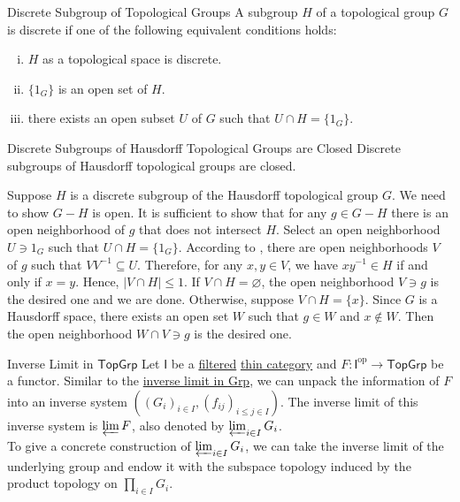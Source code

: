 \documentclass{report}
\begin{document}
\begin{definition}{Discrete Subgroup of Topological Groups}{}
	A subgroup $H$ of a topological group $G$ is {discrete} if one of the following equivalent conditions holds:
	\begin{enumerate}[(i)]
		\item $H$ as a topological space is discrete.
		\item $\{1_G\}$ is an open set of $H$.
		\item there exists an open subset $U$ of $G$ such that $U\cap H=\{1_G\}$.
	\end{enumerate}

\end{definition}

\begin{proposition}{Discrete Subgroups of Hausdorff Topological Groups are Closed}{}
	Discrete subgroups of Hausdorff topological groups are closed.
\end{proposition}
\begin{prf}
	Suppose $H$ is a discrete subgroup of the Hausdorff topological group $G$. We need to show $G-H$ is open. It is sufficient to show that for any $g \in G-H$ there is an open neighborhood of $g$ that does not intersect $H$. Select an open neighborhood $U \ni 1_G$ such that $U \cap H=\{1_G\}$. According to , there are open neighborhoods $V$ of $g$ such that $VV^{-1}\subseteq U$. Therefore, for any $x, y \in V$, we have $x y^{-1} \in H$ if and only if $x=y$. Hence, $|V \cap H| \leq 1$. If $V \cap H=\varnothing$, the open neighborhood $V\ni g$ is the desired one and we are done. Otherwise, suppose $V \cap H=\{x\}$. Since $G$ is a Hausdorff space, there exists an open set $W$ such that $g \in W$ and $x \notin W$. Then the open neighborhood $W \cap V \ni g$ is the desired one.
\end{prf}


\begin{definition}{Inverse Limit in $\mathsf{TopGrp}$}{}
	Let $\mathsf{I}$ be a \hyperref[th:filtered_category]{filtered} \hyperref[th:thin_category]{thin category} and $F:\mathsf{I}^{\mathrm{op}}\to \mathsf{TopGrp}$ be a functor. Similar to the \hyperref[th:inverse_limit_of_groups]{inverse limit in \textsf{Grp}}, we can unpack the information of $F$ into an inverse system $\left(\left(G_i\right)_{i \in I},\left(f_{i j}\right)_{i \leq j \in I}\right)$. The inverse limit of this inverse system is $\varprojlim F$, also denoted by $\varprojlim_{i\in I}G_i$.\\
	To give a concrete construction of $\varprojlim_{i\in I}G_i$, we can take the inverse limit of the underlying group and endow it with the subspace topology induced by the product topology on $\prod_{i\in I}G_i$.
\end{definition}
\end{document}
